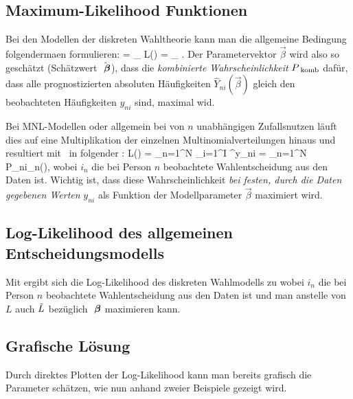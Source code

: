 \subsection{\label{sec:maxLikelihood}Maximum-Likelihood Funktionen}

Bei den Modellen der diskreten Wahltheorie kann man die allgemeine
Bedingung~ folgenderma\3en formulieren:
\be
\label{ML-diskrModelle}
\hatvecbeta= \max_{\vec{\beta}} L(\vecbeta)
 =  \max_{\vec{\beta}} \left[
P\sub{komb} \left(\vec{Y}\!_{1}(\vecbeta)=\vec{y}_1,
...,\vec{Y}\!_{N}(\vecbeta)=\vec{y}_N \right) 
\right].
\ee
Der Parametervektor
$\vec{\beta}$ wird also so gesch\"atzt (Sch\"atzwert $\hat{{\mbox{ \boldmath {$\beta$}}}}$), 
dass die  \textit{kombinierte
Wahrscheinlichkeit} $P_{{\mbox{ {\scriptsize \hspace{-0.2ex}komb}}}}$ daf\"ur, dass alle prognostizierten absoluten
H\"aufigkeiten $\hat{Y}_{ni}(\vec{\beta})$ gleich den beobachteten
H\"aufigkeiten $y_{ni}$ sind, maximal wid.

Bei MNL-Modellen oder allgemein bei von $n$ unabh\"angigen
Zufallsnutzen l\"auft dies auf eine Multiplikation der
einzelnen Multinomialverteilungen hinaus und resultiert mit~ in folgender
:  
\be
\label{LAllg}
L(\vecbeta) =  \prod_{n=1}^N \prod_{i=1}^I ^{y_{ni}}
 =  \prod_{n=1}^N P_{ni_n}(\vecbeta),
\ee
wobei $i_n$ die bei Person $n$ beobachtete Wahlentscheidung aus den Daten ist.
Wichtig ist, dass diese Wahrscheinlichkeit \textit{bei festen, durch
die Daten gegebenen Werten}
$y_{ni}$ als Funktion der Modellparameter $\vec{\beta}$
maximiert wird. 

\subsection{\label{sec:logLikelihoodDiscr}Log-Likelihood des allgemeinen Entscheidungsmodells}

Mit  ergibt sich die Log-Likelihood des diskreten
Wahlmodells zu
wobei $i_n$ die bei Person $n$ beobachtete Wahlentscheidung aus den
Daten ist und man anstelle von $L$ auch $\tilde{L}$ bez\"uglich ${\mbox{ \boldmath {$\beta$}}}$
maximieren kann.

\subsection{\label{sec:kalibrGrafisch}Grafische L\"osung}
%
Durch direktes Plotten der Log-Likelihood
kann man bereits grafisch die Parameter sch\"atzen, wie nun anhand
zweier Beispiele gezeigt wird.


